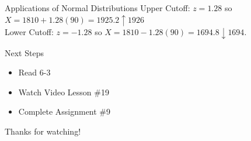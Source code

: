 \documentclass[t, aspectratio=169]{beamer}
\newcommand{\?}{\stackrel{?}{=}}
\begin{document}
	\begin{frame}{Applications of Normal Distributions}
		Upper Cutoff: $z = 1.28$ so $X = 1810 + 1.28(90) = 1925.2 \uparrow 1926$ \\ \pause
		Lower Cutoff: $z = -1.28$ so $X = 1810 - 1.28(90) = 1694.8 \downarrow 1694$.
	\end{frame}

	\begin{frame}{Next Steps}
		\begin{itemize}
			\item Read 6-3
			\item Watch Video Lesson \#19
			\item Complete Assignment \#9
		\end{itemize}
	
		\vfill
		
		Thanks for watching!
	\end{frame}
	
\end{document}
